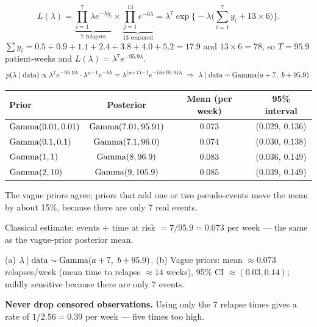 \documentclass[11pt]{article}
\begin{document}
\solution
{}
\[
L(\lambda)=\underbrace{\prod_{i=1}^{7}\lambda e^{-\lambda y_i}}_{\text{7 relapses}}\times\underbrace{\prod_{j=1}^{13}e^{-6\lambda}}_{\text{13 censored}}=\lambda^{7}\exp\Big\{-\lambda\Big(\sum_{i=1}^7y_i+13\times6\Big)\Big\}.
\]
$\sum y_i=0.5+0.9+1.1+2.4+3.8+4.0+5.2=17.9$ and $13\times6=78$, so $T=95.9$ patient-weeks and $L(\lambda)=\lambda^7e^{-95.9\lambda}$.
\[
p(\lambda\mid\text{data})\propto\lambda^{7}e^{-95.9\lambda}\cdot\lambda^{a-1}e^{-b\lambda}=\lambda^{(a+7)-1}e^{-(b+95.9)\lambda}
\ \Rightarrow\ \lambda\mid\text{data}\sim\dist{Gamma}(a+7,\ b+95.9).
\]
\begin{center}
\begin{tabular}{lccc}\toprule
Prior & Posterior & Mean (per week) & 95\% interval\\\midrule
$\mathrm{Gamma}(0.01,0.01)$ & $\mathrm{Gamma}(7.01,95.91)$ & 0.073 & (0.029, 0.136)\\
$\mathrm{Gamma}(0.1,0.1)$ & $\mathrm{Gamma}(7.1,96.0)$ & 0.074 & (0.030, 0.138)\\
$\mathrm{Gamma}(1,1)$ & $\mathrm{Gamma}(8,96.9)$ & 0.083 & (0.036, 0.149)\\
$\mathrm{Gamma}(2,10)$ & $\mathrm{Gamma}(9,105.9)$ & 0.085 & (0.039, 0.149)\\\bottomrule
\end{tabular}
\end{center}
The vague priors agree; priors that add one or two pseudo-events move the mean by about 15\%, because there are only 7 real events.

\begin{sanity}
Classical estimate: events $\div$ time at risk $=7/95.9=0.073$ per week --- the same as the vague-prior posterior mean. \checkmark
\end{sanity}

\begin{answer}
(a) $\lambda\mid\text{data}\sim\dist{Gamma}(a+7,\ b+95.9)$. \quad (b) Vague priors: mean $\approx0.073$ relapses/week (mean time to relapse $\approx14$ weeks), 95\% CI $\approx(0.03,0.14)$; mildly sensitive because there are only 7 events.
\end{answer}

\begin{takeaway}
\textbf{Never drop censored observations.} Using only the 7 relapse times gives a rate of $1/2.56=0.39$ per week --- five times too high.
\end{takeaway}
\end{document}

